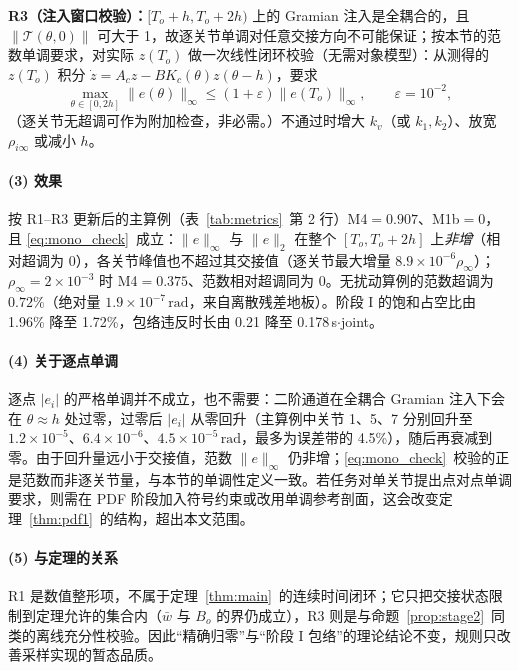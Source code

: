 \textbf{R3（注入窗口校验）：}\([T_o+h,T_o+2h)\) 上的 Gramian 注入是全耦合的，且 \(\lVert\mathcal T(\theta,0)\rVert\) 可大于 1，故逐关节单调对任意交接方向不可能保证；按本节的范数单调要求，对实际 \(z(T_o)\) 做一次线性闭环校验（无需对象模型）：从测得的 \(z(T_o)\) 积分 \(\dot z=A_cz-BK_c(\theta)z(\theta-h)\)，要求
\begin{equation}
\max_{\theta\in[0,2h]}\lVert e(\theta)\rVert_\infty
\le(1+\varepsilon)\lVert e(T_o)\rVert_\infty,
\qquad \varepsilon=10^{-2},
\label{eq:mono_check}
\end{equation}
（逐关节无超调可作为附加检查，非必需。）不通过时增大 \(k_v\)（或 \(k_1,k_2\)）、放宽 \(\rho_{i\infty}\) 或减小 \(h\)。

\paragraph{(3) 效果}
按 R1--R3 更新后的主算例（表~\ref{tab:metrics}~第 2 行）M4\(=0.907\)、M1b\(=0\)，且 \eqref{eq:mono_check}~成立：\(\lVert e\rVert_\infty\) 与 \(\lVert e\rVert_2\) 在整个 \([T_o,T_o+2h]\) 上\emph{非增}（相对超调为 0），各关节峰值也不超过其交接值（逐关节最大增量 \(8.9\times10^{-6}\rho_\infty\)）；\(\rho_\infty=2\times10^{-3}\) 时 M4\(=0.375\)、范数相对超调同为 0。无扰动算例的范数超调为 \(0.72\%\)（绝对量 \(1.9\times10^{-7}\,\mathrm{rad}\)，来自离散残差地板）。阶段 I 的饱和占空比由 1.96\% 降至 1.72\%，包络违反时长由 0.21 降至 0.178\,s\(\cdot\)joint。

\paragraph{(4) 关于逐点单调}
逐点 \(\lvert e_i\rvert\) 的严格单调并不成立，也不需要：二阶通道在全耦合 Gramian 注入下会在 \(\theta\approx h\) 处过零，过零后 \(\lvert e_i\rvert\) 从零回升（主算例中关节 1、5、7 分别回升至 \(1.2\times10^{-5}\)、\(6.4\times10^{-6}\)、\(4.5\times10^{-5}\,\mathrm{rad}\)，最多为误差带的 4.5\%），随后再衰减到零。由于回升量远小于交接值，范数 \(\lVert e\rVert_\infty\) 仍非增；\eqref{eq:mono_check}~校验的正是范数而非逐关节量，与本节的单调性定义一致。若任务对单关节提出点对点单调要求，则需在 PDF 阶段加入符号约束或改用单调参考剖面，这会改变定理~\ref{thm:pdf1}~的结构，超出本文范围。

\paragraph{(5) 与定理的关系}
R1 是数值整形项，不属于定理~\ref{thm:main}~的连续时间闭环；它只把交接状态限制到定理允许的集合内（\(\bar w\) 与 \(B_o\) 的界仍成立），R3 则是与命题~\ref{prop:stage2}~同类的离线充分性校验。因此“精确归零”与“阶段 I 包络”的理论结论不变，规则只改善采样实现的暂态品质。

